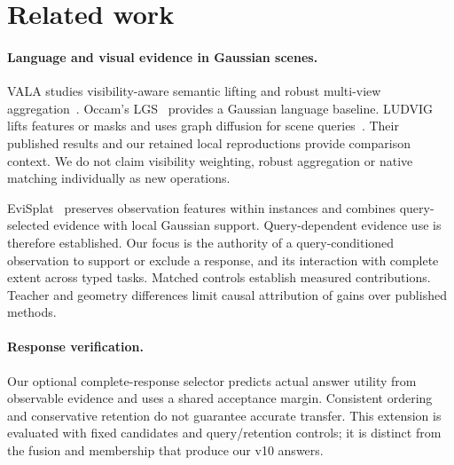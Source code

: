 \section{Related work}
\paragraph{Language and visual evidence in Gaussian scenes.}
VALA studies visibility-aware semantic lifting and robust multi-view
aggregation~\cite{vala}. Occam's LGS~\cite{occam} provides a Gaussian language
baseline. LUDVIG lifts features or masks and uses graph diffusion for scene
queries~\cite{ludvig}. Their published results and our retained local
reproductions provide comparison context. We do not claim visibility weighting,
robust aggregation or native matching individually as new operations.

EviSplat~\cite{evisplat} preserves observation features within instances and
combines query-selected evidence with local Gaussian support. Query-dependent
evidence use is therefore established. Our focus is the authority of a
query-conditioned observation to support or exclude a response, and its
interaction with complete extent across typed tasks. Matched controls establish
measured contributions. Teacher and geometry differences limit causal
attribution of gains over published methods.

\paragraph{Response verification.}
Our optional complete-response selector predicts actual answer utility from
observable evidence and uses a shared acceptance margin. Consistent ordering
and conservative retention do not guarantee accurate transfer. This extension
is evaluated with fixed candidates and query/retention controls; it is distinct
from the fusion and membership that produce our v10 answers.

